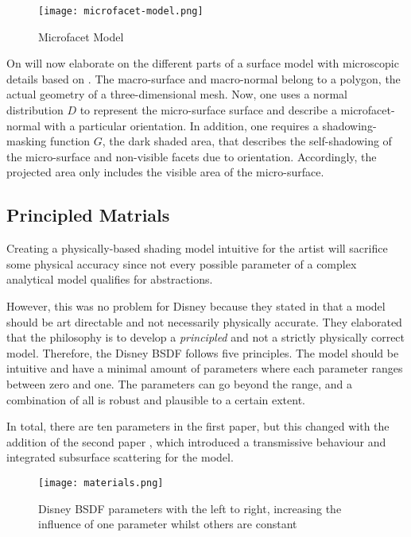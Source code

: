 \begin{figure}[h]
\centering
\texttt{[image: microfacet-model.png]}
\caption[]{Microfacet Model}
\label{fig:microfacet-normal}
\end{figure}

On will now elaborate on the different parts of a surface model with microscopic details based on \cite{heitz_understanding_2014}.
The macro-surface and macro-normal belong to a polygon, the actual geometry of a three-dimensional mesh.
Now, one uses a normal distribution $D$ to represent the micro-surface surface and describe a microfacet-normal with a particular orientation.
In addition, one requires a shadowing-masking function $G$, the dark shaded area, that describes the self-shadowing of the micro-surface and non-visible facets due to orientation.
Accordingly, the projected area only includes the visible area of the micro-surface.

\subsection{Principled Matrials}

Creating a physically-based shading model intuitive for the artist will sacrifice some physical accuracy since not every possible parameter of a complex analytical model qualifies for abstractions.

However, this was no problem for Disney because they stated in \cite{burley_physically_2012} that a model should be art directable and not necessarily physically accurate.
They elaborated that the philosophy is to develop a \textit{principled} and not a strictly physically correct model.
Therefore, the Disney BSDF follows five principles.
The model should be intuitive and have a minimal amount of parameters where each parameter ranges between zero and one.
The parameters can go beyond the range, and a combination of all is robust and plausible to a certain extent.

In total, there are ten parameters in the first paper, but this changed with the addition of the second paper \cite{burley_extending_2015}, which introduced a transmissive behaviour and integrated subsurface scattering for the model.

\begin{figure}[h]
\centering
\texttt{[image: materials.png]}
\caption[]{Disney BSDF parameters with the left to right, increasing the influence of one parameter whilst others are constant}
\label{fig:materials}
\end{figure}

